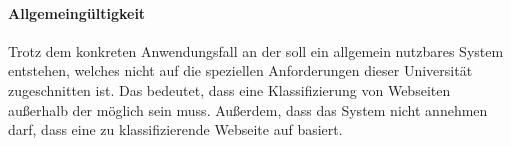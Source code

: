         \paragraph*{Allgemeingültigkeit}
        Trotz dem konkreten Anwendungsfall an der {\fernUni}
        soll ein allgemein nutzbares System entstehen,
        welches nicht auf die speziellen Anforderungen dieser Universität
        zugeschnitten ist.
        Das bedeutet, dass eine Klassifizierung von Webseiten außerhalb
        der {\fernUni} möglich sein muss.
        Außerdem, dass das System nicht annehmen darf,
        dass eine zu klassifizierende Webseite auf {\wordpress} basiert.
